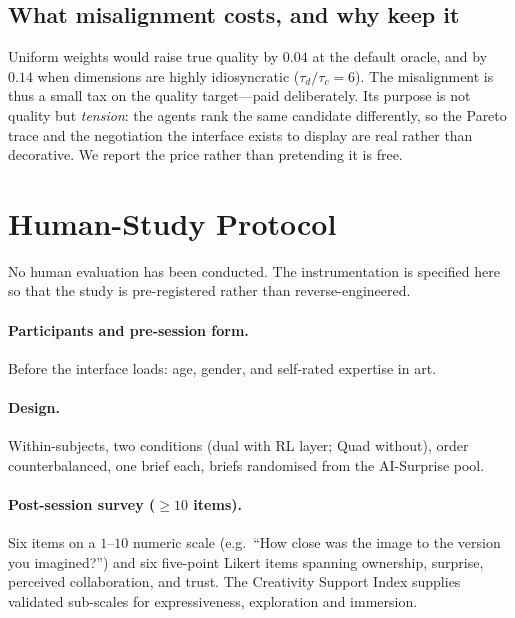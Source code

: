 \documentclass[11pt]{article}
\theoremstyle{plain}
\theoremstyle{definition}
\begin{document}
\subsection{What misalignment costs, and why keep it}
Uniform weights would raise true quality by $0.04$ at the default oracle, and by
$0.14$ when dimensions are highly idiosyncratic ($\tau_d/\tau_c = 6$). The
misalignment is thus a small tax on the quality target---paid deliberately. Its
purpose is not quality but \emph{tension}: the agents rank the same candidate
differently, so the Pareto trace and the negotiation the interface exists to
display are real rather than decorative. We report the price rather than
pretending it is free.

\section{Human-Study Protocol}
\label{sec:human}
No human evaluation has been conducted. The instrumentation is specified here so
that the study is pre-registered rather than reverse-engineered.

\paragraph{Participants and pre-session form.}
Before the interface loads: age, gender, and self-rated expertise in art.

\paragraph{Design.}
Within-subjects, two conditions (dual with RL layer; Quad without), order
counterbalanced, one brief each, briefs randomised from the AI-Surprise pool.

\paragraph{Post-session survey ($\ge 10$ items).}
Six items on a $1$--$10$ numeric scale (e.g.\ ``How close was the image to the
version you imagined?'') and six five-point Likert items
\citep{likert1932technique} spanning ownership, surprise, perceived
collaboration, and trust. The Creativity Support Index
\citep{cherry2014quantifying} supplies validated sub-scales for expressiveness,
exploration and immersion.
\end{document}

